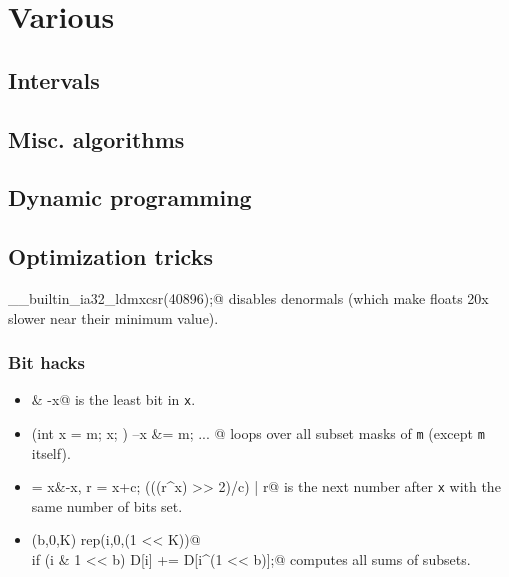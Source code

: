 \chapter{Various}

\section{Intervals}

\section{Misc. algorithms}

\section{Dynamic programming}


\section{Optimization tricks}
	\verb@__builtin_ia32_ldmxcsr(40896);@ disables denormals (which make floats 20x slower near their minimum value).
	\subsection{Bit hacks}
		\begin{itemize}
			\item \verb@x & -x@ is the least bit in \texttt{x}.
			\item \verb@for (int x = m; x; ) { --x &= m; ... }@ loops over all subset masks of \texttt{m} (except \texttt{m} itself).
			\item \verb@c = x&-x, r = x+c; (((r^x) >> 2)/c) | r@ is the next number after \texttt{x} with the same number of bits set.
			\item \verb@rep(b,0,K) rep(i,0,(1 << K))@ \\ \verb@  if (i & 1 << b) D[i] += D[i^(1 << b)];@ computes all sums of subsets.
		\end{itemize}
